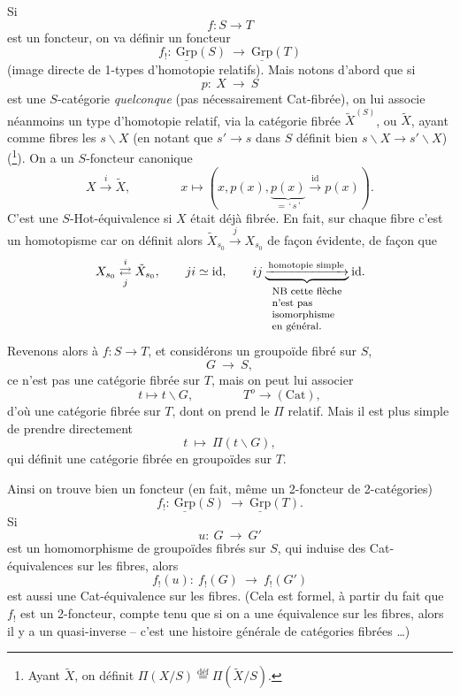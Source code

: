 \documentclass[11pt]{article}
\newcommand{\printedpage}[1]{\marginpar{\footnotesize p.~#1}}
\newcommand{\msp}[1]{\marginpar{\footnotesize [#1]}}
\newcommand{\Grp}{\underline{\mathrm{Grp}}}
\begin{document}
\clearpage

\printedpage{2}

\msp{page 2}

Si
\[ f : S \longrightarrow T \]
est un foncteur, on va définir un foncteur
\[ f_! :\ \Grp(S) \ \longrightarrow\ \Grp(T) \]
(image directe de 1-types d'homotopie relatifs). Mais notons d'abord que si
\[ p :\ X \ \longrightarrow\ S \]
est une $S$-catégorie \textit{quelconque} (pas nécessairement Cat-fibrée), on lui associe néanmoins un type d'homotopie relatif, via la catégorie fibrée $\tilde{X}^{(S)}$, ou $\tilde{X}$, ayant comme fibres les $s\backslash X$ (en notant que $s' \longrightarrow s$ dans $S$ définit bien $s\backslash X \longrightarrow s'\backslash X$) (\footnote{Ayant $\tilde{X}$, on définit $\Pi(X/S) \overset{\text{déf}}{=} \Pi(\tilde{X}/S)$.}). On a un $S$-foncteur canonique
\[ X \xrightarrow{\ i\ } \tilde{X}, \qquad\qquad x \longmapsto (x, p(x), \underbrace{p(x)}_{=\,\text{‘}\,s\,\text{’}} \xrightarrow{\ \mathrm{id}\ } p(x)). \]
C'est une $S$-Hot-équivalence si $X$ était déjà fibrée. En fait, sur chaque fibre c'est un homotopisme car on définit alors $\tilde{X}_{s_0} \xrightarrow{\ j\ } X_{s_0}$ de façon évidente, de façon que
\[
X_{s_0} \underset{j}{\overset{i}{\rightleftarrows}} \tilde{X}_{s_0}, \qquad ji \simeq \mathrm{id}, \qquad ij \underbrace{\xrightarrow{\text{homotopie simple}}}_{\text{\footnotesize\begin{tabular}{l}NB cette flèche\\ n'est pas \\ isomorphisme\\ en général.\end{tabular}}} \mathrm{id}.
\]
Revenons alors à $f : S \longrightarrow T$, et considérons un groupoïde fibré sur $S$,
\[ G \ \longrightarrow\ S, \]
ce n'est pas une catégorie fibrée sur $T$, mais on peut lui associer
\[ t \longmapsto t\backslash G, \qquad\qquad T^o \longrightarrow (\mathrm{Cat}), \]
d'où une catégorie fibrée sur $T$, dont on prend le $\Pi$ relatif. Mais il est plus simple de prendre directement
\[ t \ \longmapsto\ \Pi(t\backslash G), \]
qui définit une catégorie fibrée en groupoïdes sur $T$.

\clearpage

\printedpage{3}

\msp{page 3}

Ainsi on trouve bien un foncteur (en fait, même un 2-foncteur de 2-catégories)
\[ f_! :\ \Grp(S) \ \longrightarrow\ \Grp(T). \]
Si
\[ u :\ G \ \longrightarrow\ G' \]
est un homomorphisme de groupoïdes fibrés sur $S$, qui induise des Cat-équivalences sur les fibres, alors
\[ f_!(u) :\ f_!(G) \ \longrightarrow\ f_!(G') \]
est aussi une Cat-équivalence sur les fibres. (Cela est formel, à partir du fait que $f_!$ est un 2-foncteur, compte tenu que si on a une équivalence sur les fibres, alors il y a un quasi-inverse -- c'est une histoire générale de catégories fibrées \dots)
\end{document}
